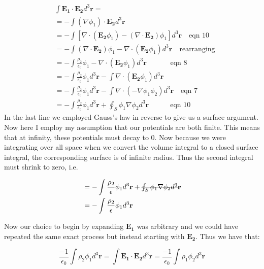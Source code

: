 \documentclass[a4paper, 11pt]{article}
\begin{document}
\begin{align*}
	&\int \mathbf{E_1} \cdot \mathbf{E_2}  d^3\mathbf{r} = \\ 
	&= - \int (\nabla \phi_1) \cdot \mathbf{E_2} d^3\mathbf{r} \\ 
	&= - \int [\nabla \cdot (\mathbf{E_2}\phi_1)-(\nabla \cdot \mathbf{E_2})\phi_1] d^3\mathbf{r} \quad \mbox{eqn 10} \\ 
	&= - \int (\nabla \cdot \mathbf{E_2})\phi_1 - \nabla \cdot (\mathbf{E_2}\phi_1) d^3\mathbf{r} \quad \mbox{rearranging}\\ 
	&= -\int \frac{\rho_2}{\epsilon_0}\phi_1 - \nabla \cdot (\mathbf{E_2}\phi_1) d^3\mathbf{r}  \quad \quad \quad \mbox{ eqn 8}\\ 
	&= - \int \frac{\rho_2}{\epsilon_0}\phi_1 d^3\mathbf{r} - \int \nabla \cdot (\mathbf{E_2}\phi_1) d^3 \mathbf{r} \\
	&= - \int \frac{\rho_2}{\epsilon_0}\phi_1 d^3\mathbf{r} - \int \nabla \cdot (-\nabla \phi_1 \phi_2) d^3\mathbf{r} \quad \mbox{eqn 7} \\ 
	&= -\int \frac{\rho_2}{\epsilon_0}\phi_1d^3\mathbf{r} + \oint_S \phi_1 \nabla\phi_2 d^3\mathbf{r} \quad \quad \quad \mbox{eqn 10}
\end{align*}
In the last line we employed Gauss's law in reverse to give us a surface argument. Now here I employ my assumption that our potentials are both finite. This means that at infinity, these potentials must decay to 0. Now because we were integrating over all space when we convert the volume integral to a closed surface integral, the corresponding surface is of infinite radius. Thus the second integral must shrink to zero, i.e. 

\begin{align*}
	&= -\int \frac{\rho_2}{\epsilon}\phi_1 d^3\mathbf{r} + \mbox{\sout{$\oint_S \phi_1 \nabla\phi_2 d^3\mathbf{r}$}} \\ 
	&= -\int \frac{\rho_2}{\epsilon}\phi_1 d^3\mathbf{r} 
\end{align*} 

Now our choice to begin by expanding $\mathbf{E_1}$ was arbitrary and we could have repeated the same exact process but instead starting with $\mathbf{E_2}$. Thus we have that: 

\begin{equation}
	\frac{-1}{\epsilon_0} \int \rho_2 \phi_1 d^3\mathbf{r} = \int \mathbf{E_1} \cdot \mathbf{E_2} d^3\mathbf{r} = \frac{-1}{\epsilon_0} \int \rho_1 \phi_2 d^3\mathbf{r} 
\end{equation}
\end{document}
